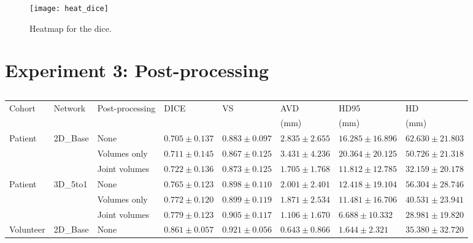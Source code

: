 \begin{figure}[htbp]	
	\centering
	\texttt{[image: heat\_dice]}
    \caption[Heatmap for the \acrlong{dice}.]{Heatmap for the \acrlong{dice}.}
    \label{fig:results_heat_dice}
\end{figure}

\section{Experiment 3: Post-processing} %

\begin{sidewaystable}[htbp]
   \centering
   \caption[Segmentation Evaluation Metrics for the different Architectures]{}
   \begin{tabular}{l*{7}{l}}
      \toprule
      Cohort	& Network	& Post-processing	& DICE				& VS				& AVD				& HD95				& HD				\\
      			&					&					&					&					& (mm)				& (mm)				& (mm)				\\
      \midrule
      Patient   & 2D\_Base 	& None & $0.705 \pm 0.137$ & $\mathbf{0.883 \pm 0.097}$ & $2.835 \pm 2.655$ & $16.285 \pm 16.896$ & $62.630 \pm 21.803$ \\
                &                	& Volumes only  & $0.711 \pm 0.145$ & $0.867 \pm 0.125$ & $3.431 \pm 4.236$ & $20.364 \pm 20.125$ & $50.726 \pm 21.318$ \\
                &                	& Joint volumes & $\mathbf{0.722 \pm 0.136}$ & $0.873 \pm 0.125$ & $\mathbf{1.705 \pm 1.768}$ & $\mathbf{11.812 \pm 12.785}$& $\mathbf{32.159 \pm 20.178}$ \\
      \midrule
      Patient   & 3D\_5to1 	& None & $0.765 \pm 0.123$ & $0.898 \pm 0.110$ & $2.001 \pm 2.401$ & $12.418 \pm 19.104$ & $56.304 \pm 28.746$ \\
                &                	& Volumes only  & $0.772 \pm 0.120$ & $0.899 \pm 0.119$ & $1.871 \pm 2.534$ & $11.481 \pm 16.706$ & $40.531 \pm 23.941$ \\
                &                	& Joint volumes      & $\mathbf{0.779 \pm 0.123}$ & $\mathbf{0.905 \pm 0.117}$ & $\mathbf{1.106 \pm 1.670}$ & $\mathbf{6.688  \pm 10.332}$ & $\mathbf{28.981 \pm 19.820}$ \\
      \midrule
      Volunteer & 2D\_Base 	& None & $0.861 \pm 0.057$ & $0.921 \pm 0.056$ & $0.643 \pm 0.866$ & $1.644  \pm 2.321 $ & $35.380 \pm 32.720$ \\

\end{tabular}
\end{sidewaystable}
